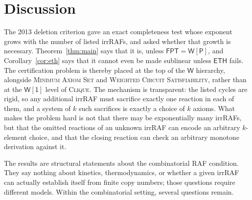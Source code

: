 \documentclass[11pt,a4paper]{article}
\theoremstyle{plain}
\theoremstyle{definition}
\theoremstyle{remark}
\newcommand{\MAS}{\textup{\textsc{Minimum Axiom Set}}}
\newcommand{\Clique}{\textup{\textsc{Clique}}}
\newcommand{\FPT}{\mathsf{FPT}}
\newcommand{\WP}{\mathsf{W[P]}}
\newcommand{\Wone}{\mathsf{W[1]}}
\newcommand{\ETH}{\mathsf{ETH}}
\begin{document}
\section{Discussion}\label{sec:discussion}

The 2013 deletion criterion gave an exact completeness test whose exponent grows with the number of listed irrRAFs, and asked whether that growth is necessary. Theorem~\ref{thm:main} says that it is, unless $\FPT=\WP$, and Corollary~\ref{cor:eth} says that it cannot even be made sublinear unless $\ETH$ fails. The certification problem is thereby placed at the top of the $\mathsf{W}$ hierarchy, alongside \MAS{} and \textsc{Weighted Circuit Satisfiability}, rather than at the $\Wone$ level of \Clique. The mechanism is transparent: the listed cycles are rigid, so any additional irrRAF must sacrifice exactly one reaction in each of them, and a system of $k$ such sacrifices is exactly a choice of $k$ axioms. What makes the problem hard is not that there may be exponentially many irrRAFs, but that the omitted reactions of an unknown irrRAF can encode an arbitrary $k$-element choice, and that the closing reaction can check an arbitrary monotone derivation against it.

The results are structural statements about the combinatorial RAF condition. They say nothing about kinetics, thermodynamics, or whether a given irrRAF can actually establish itself from finite copy numbers; those questions require different models. Within the combinatorial setting, several questions remain.
\end{document}
